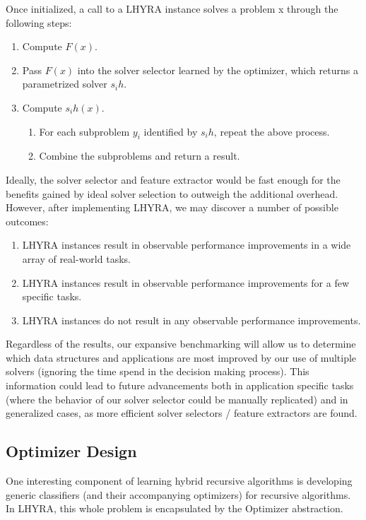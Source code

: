 \documentclass{article}
\begin{document}
Once initialized, a call to a LHYRA instance solves a problem x through the following steps:

\begin{enumerate}
	\item Compute $F(x)$.
	\item Pass $F(x)$ into the solver selector learned by the optimizer, which returns a parametrized solver $s_ih$.
	\item Compute $s_ih(x)$.
	\begin{enumerate}
		\item For each subproblem $y_i$ identified by $s_ih$, repeat the above process.
		\item Combine the subproblems and return a result.
	\end{enumerate}
\end{enumerate}

Ideally, the solver selector and feature extractor would be fast enough for the benefits gained by ideal solver selection to outweigh the additional overhead. However, after implementing LHYRA, we may discover a number of possible outcomes:

\begin{enumerate}
	\item LHYRA instances result in observable performance improvements in a wide array of real-world tasks.
	\item LHYRA instances result in observable performance improvements for a few specific tasks.
	\item LHYRA instances do not result in any observable performance improvements.
\end{enumerate}

Regardless of the results, our expansive benchmarking will allow us to determine which data structures and applications are most improved by our use of multiple solvers (ignoring the time spend in the decision making process). This information could lead to future advancements both in application specific tasks (where the behavior of our solver selector could be manually replicated) and in generalized cases, as more efficient solver selectors / feature extractors are found.

\subsection*{Optimizer Design}

One interesting component of learning hybrid recursive algorithms is developing generic classifiers (and their accompanying optimizers) for recursive algorithms.  In LHYRA, this whole problem is encapsulated by the Optimizer abstraction.
\end{document}

